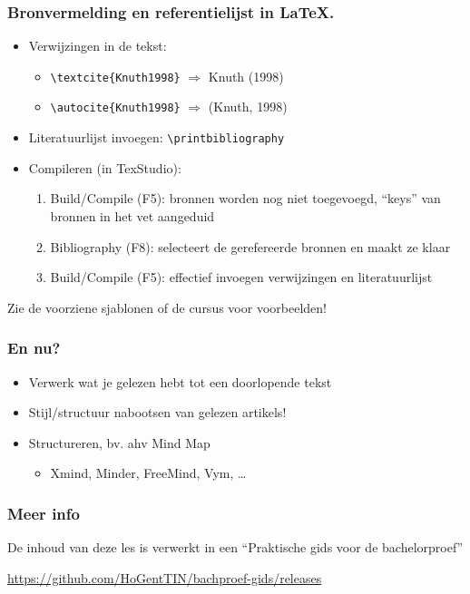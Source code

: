 \documentclass[aspectratio=169]{beamer}
\begin{document}
\begin{frame}[fragile]
  \frametitle{Bronvermelding en referentielijst in {\LaTeX}.}

  \begin{itemize}
    \item Verwijzingen in de tekst:

    \begin{itemize}
      \item \verb|\textcite{Knuth1998}| \(\Rightarrow\) Knuth (1998)
      \item \verb|\autocite{Knuth1998}| \(\Rightarrow\) (Knuth, 1998)
    \end{itemize}

    \item Literatuurlijst invoegen: \verb|\printbibliography|

    \item Compileren (in TexStudio):

    \begin{enumerate}
      \item Build/Compile (F5): bronnen worden nog niet toegevoegd, ``keys'' van bronnen in het vet aangeduid
      \item Bibliography (F8): selecteert de gerefereerde bronnen en maakt ze klaar
      \item Build/Compile (F5): effectief invoegen verwijzingen en literatuurlijst
    \end{enumerate}
  \end{itemize}

  Zie de voorziene sjablonen of de cursus voor voorbeelden!
\end{frame}

\begin{frame}
  \frametitle{En nu?}

  \begin{itemize}
    \item Verwerk wat je gelezen hebt tot een doorlopende tekst
    \item Stijl/structuur nabootsen van gelezen artikels!
    \item Structureren, bv. ahv Mind Map
      \begin{itemize}
        \item Xmind, Minder, FreeMind, Vym, \ldots
      \end{itemize}
  \end{itemize}
\end{frame}

\begin{frame}
  \frametitle{Meer info}

  De inhoud van deze les is verwerkt in een ``Praktische gids voor de bachelorproef''

  \vspace{12pt}

  \url{https://github.com/HoGentTIN/bachproef-gids/releases}

\end{frame}
\end{document}
